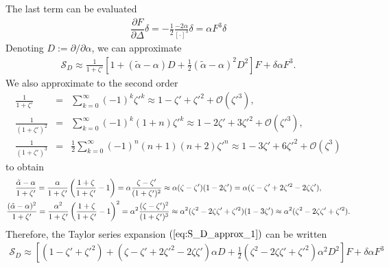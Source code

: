 \documentclass [12pt, a4paper] {article}
\newcommand{\pdiff}[2]
{
	\dfrac{\partial #1}{\partial #2}
}
\begin{document}
The last term can be evaluated 
\begin {eqnarray}
    \pdiff{F}{\Delta}\delta
    =
    - \frac{1}{2}
    \frac{-2\alpha}{[\cdot]^3}\delta
    = \alpha F^3\delta
\end {eqnarray}
Denoting $D := \partial/\partial\alpha$, we can approximate 
\begin {eqnarray}
    \label{eq:S_D_approx_1}
    \mathcal{S}_D 
    \approx
    \frac{1}{1 + \zeta'} 
    \left[
        1 
        + 
        (\tilde\alpha - \alpha)D
        + 
        \frac{1}{2}(\tilde\alpha - \alpha)^2D^2
    \right]F 
    + \delta\alpha F^3.
\end {eqnarray}
We also approximate to the second order 
\begin {eqnarray}
    \frac{1}{1 + \zeta'}
    &=&
    \sum_{k=0}^\infty 
    (-1)^k
    \zeta'^k
    \approx 
    1 - \zeta' + \zeta'^2 + \mathcal{O}(\zeta'^3),
    \\
    \frac{1}{(1 + \zeta')^2}
    &=&
    \sum_{k=0}^\infty 
    (-1)^k(1 + n)
    \zeta'^k
    \approx 
    1 - 2\zeta' + 3\zeta'^2 + \mathcal{O}(\zeta'^3),
    \\
    \frac{1}{(1 + \zeta')^3}
    &=&
    \frac{1}{2}
    \sum_{k=0}^\infty 
    (-1)^n(n+1)(n+2)\zeta'^n
    \approx 
    1 - 3\zeta' + 6\zeta'^2 + \mathcal{O}(\zeta^3)
\end {eqnarray}
to obtain 
\begin {eqnarray}
    \frac{\tilde\alpha - \alpha}{1 + \zeta'}
    =
        \frac{\alpha}{1 + \zeta'}
    \left(
        \frac{1 + \zeta}{1 + \zeta'} - 1
    \right)
    =
    \alpha
    \frac{\zeta - \zeta'}{(1 + \zeta')^2}
    \approx
    \alpha(\zeta - \zeta')(1 - 2\zeta')
    =
    \alpha(\zeta - \zeta' + 2\zeta'^2 - 2\zeta\zeta'), 
    \hspace{1.3cm}
    \\
    \frac{(\tilde\alpha - \alpha)^2}{1 + \zeta'}
    =
    \frac{\alpha^2}{1 + \zeta'}
    \left(
        \frac{1 + \zeta}{1 + \zeta'} - 1
    \right)^2
    =
    \alpha^2
    \frac{(\zeta - \zeta')^2}{(1 + \zeta')^3}
    \approx 
    \alpha^2
    (\zeta^2 - 2\zeta\zeta' + \zeta'^2)(1 - 3\zeta')
    \approx 
    \alpha^2(\zeta^2 - 2\zeta\zeta' + \zeta'^2).
\end {eqnarray}
Therefore, the Taylor series expansion $(\ref{eq:S_D_approx_1})$ can be written 
\begin {eqnarray}
    \label{eq:S_D_approx_2}
    \mathcal{S}_D 
    \approx 
    \left[
        (1 - \zeta' + \zeta'^2) 
        + 
        (\zeta - \zeta' + 2\zeta'^2 - 2\zeta\zeta')\alpha D
        + 
        \frac{1}{2}
        (\zeta^2 - 2\zeta\zeta' + \zeta'^2)\alpha^2 D^2
    \right]F 
    +
    \delta\alpha F^3
\end {eqnarray}
\end{document}
